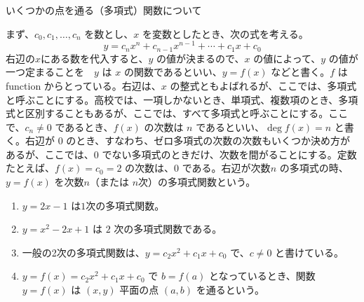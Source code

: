 \documentclass[10pt, dvipdfmx]{beamer}
\begin{document}
%
%
\begin{frame}{いくつかの点を通る（多項式）関数について}

まず、\(c_0, c_1, \ldots, c_n\) を数とし、\(x\) を変数としたとき、次の式を考える。  
\[
y = c_nx^n + c_{n-1}x^{n-1} + \cdots + c_1x+c_0
\]
右辺の\(x\)にある数を代入すると、\(y\) の値が決まるので、\(x\) の値によって、\(y\) の値が一つ定まることを　\(y\) は \(x\) の関数であるといい、\(y = f(x)\) などと書く。\(f\) は function からとっている。右辺は、\(x\) の整式ともよばれるが、ここでは、多項式と呼ぶことにする。高校では、一項しかないとき、単項式、複数項のとき、多項式と区別することもあるが、ここでは、すべて多項式と呼ぶことにする。ここで、\(c_n\neq 0\) であるとき、\(f(x)\) の次数は \(n\) であるといい、\(\deg f(x) = n\) と書く。右辺が \(0\) のとき、すなわち、ゼロ多項式の次数の次数もいくつか決め方があるが、ここでは、\(0\) でない多項式のときだけ、次数を間がることにする。定数たとえば、\(f(x) = c_0 = 2\) の次数は、\(0\) である。右辺が次数\(n\) の多項式の時、\(y = f(x)\) を次数\(n\)（または \(n\)次）の多項式関数という。
\begin{enumerate}
\item  \(y = 2x - 1\) は\(1\)次の多項式関数。
\item  \(y = x^2 -2x + 1\) は \(2\) 次の多項式関数である。
\item 一般の2次の多項式関数は、\(y = c_2x^2 + c_1x + c_0\) で、\(c\neq 0\) と書けている。
\item  \(y = f(x) = c_2x^2 + c_1x + c_0\) で \(b = f(a)\) となっているとき、関数 \(y = f(x)\) は \((x,y)\) 平面の点 \((a,b)\) を通るという。
\end{enumerate}
\end{frame}
\end{document}
